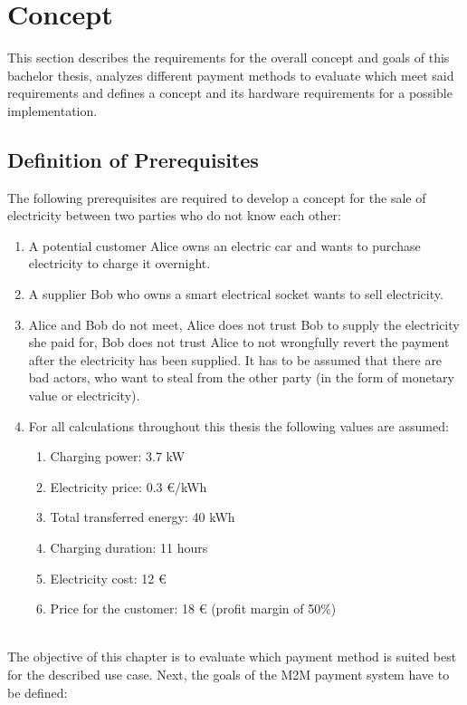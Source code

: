 \section{Concept}
This section describes the requirements for the overall concept and goals of this bachelor thesis, analyzes different payment methods to evaluate which meet said requirements and defines a concept and its hardware requirements for a possible implementation.
\\
\subsection{Definition of Prerequisites}

The following prerequisites are required to develop a concept for the sale of electricity between two parties who do not know each other:
\begin{enumerate}
    \item A potential customer Alice owns an electric car and wants to purchase electricity to charge it overnight.
    \item A supplier Bob who owns a smart electrical socket wants to sell electricity.
    \item Alice and Bob do not meet, Alice does not trust Bob to supply the electricity she paid for, Bob does not trust Alice to not wrongfully revert the payment after the electricity has been supplied.
    It has to be assumed that there are bad actors, who want to steal from the other party (in the form of monetary value or electricity).
    \item For all calculations throughout this thesis the following values are assumed:
    \begin{enumerate}
        \item Charging power: 3.7 kW
        \item Electricity price: 0.3 \euro/kWh
        \item Total transferred energy: 40 kWh
        \item Charging duration: 11 hours
        \item Electricity cost: 12 \euro
        \item Price for the customer: 18 \euro{} (profit margin of 50\%)
    \end{enumerate}
\end{enumerate}
\leavevmode
\\
The objective of this chapter is to evaluate which payment method is suited best for the described use case.
Next, the goals of the M2M payment system have to be defined:

